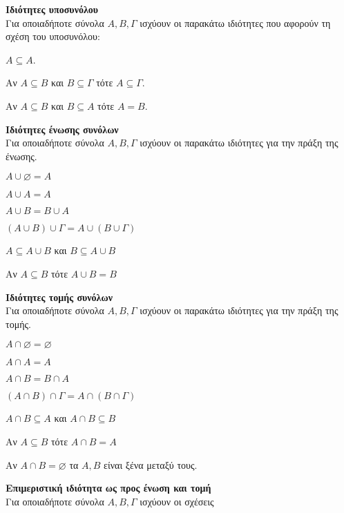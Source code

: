 \documentclass[twoside,nofonts,internet,math,spyros]{frontisthrio}
\begin{document}
\thewrhmata
\begin{arithmisi}
\item\textbf{Ιδιότητες υποσυνόλου}\\
Για οποιαδήποτε σύνολα $ A,B,\varGamma $ ισχύουν οι παρακάτω ιδιότητες που αφορούν τη σχέση του υποσυνόλου:
\begin{rlist}
\item $ A\subseteq A $.
\item Αν $ A\subseteq B $ και $ B\subseteq \varGamma $ τότε $ A\subseteq \varGamma $.
\item Αν $ A\subseteq B $ και $ B\subseteq A $ τότε $ A=B $.
\end{rlist}
\item\textbf{Ιδιότητες ένωσης συνόλων}\\
Για οποιαδήποτε σύνολα $ A,B,\varGamma $ ισχύουν οι παρακάτω ιδιότητες για την πράξη της ένωσης.
\begin{multicols}{2}
\begin{rlist}
\item $ A\cup\varnothing=A $
\item $ A\cup A=A $
\item $ A\cup B=B\cup A $
\item $ (A\cup B)\cup\varGamma=A\cup(B\cup\varGamma) $
\item $ A\subseteq A\cup B $ και $ B\subseteq A\cup B $
\item Αν $ A\subseteq B $ τότε $ A\cup B=B $
\end{rlist}
\end{multicols}
\item\textbf{Ιδιότητες τομής συνόλων}\\
Για οποιαδήποτε σύνολα $ A,B,\varGamma $ ισχύουν οι παρακάτω ιδιότητες για την πράξη της τομής.
\begin{multicols}{2}
\begin{rlist}
\item $ A\cap\varnothing=\varnothing $
\item $ A\cap A=A $
\item $ A\cap B=B\cap A $
\item $ (A\cap B)\cap\varGamma=A\cap(B\cap\varGamma) $
\item $ A\cap B\subseteq A $ και $ A\cap B\subseteq B $
\item Αν $ A\subseteq B $ τότε $ A\cap B=A $
\item Αν $ A\cap B=\varnothing $ τα $ A,B $ είναι ξένα μεταξύ τους.
\end{rlist}
\end{multicols}
\item\textbf{Επιμεριστική ιδιότητα ως προς ένωση και τομή}\\
Για οποιαδήποτε σύνολα $ A,B,\varGamma $ ισχύουν οι σχέσεις
\begin{center}
\end{center}
\end{arithmisi}
\end{document}
